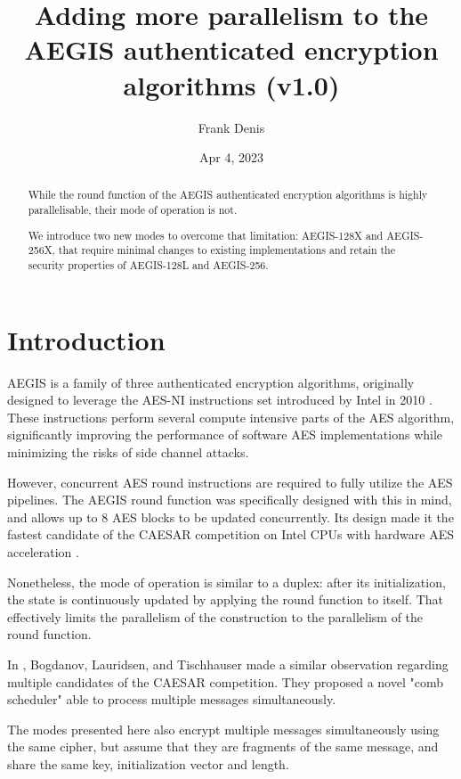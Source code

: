 \documentclass[envcountsame,runningheads,notitlepage]{llncs}
\title{Adding more parallelism to the AEGIS authenticated encryption algorithms (v1.0)}
\date{Apr 4, 2023}
\author{
  Frank Denis\inst{}
}
\institute{Fastly Inc.\\
  \href{mailto:fde@00f.net}{fde@00f.net}
}
\author{}
\institute{}
\begin{document}
\maketitle

\markboth{}{}

\begin{abstract}
  While the round function of the AEGIS authenticated encryption algorithms is highly parallelisable, their mode of operation is not.

  We introduce two new modes to overcome that limitation: AEGIS-128X and AEGIS-256X, that require minimal changes to existing implementations and retain the security properties of AEGIS-128L and AEGIS-256.
\end{abstract}

\section{Introduction}
\label{sec:introduction}

AEGIS \cite{SAC:WuPre13} is a family of three authenticated encryption algorithms, originally designed to leverage the AES-NI instructions set introduced by Intel in 2010 \cite{Akdemir2010BreakthroughAP}.
These instructions perform several compute intensive parts of the AES algorithm, significantly improving the performance of software AES implementations while minimizing the risks of side channel attacks.

However, concurrent AES round instructions are required to fully utilize the AES pipelines. The AEGIS round function was specifically designed with this in mind, and allows up to 8 AES blocks to be updated concurrently. Its design made it the fastest candidate of the CAESAR competition on Intel CPUs with hardware AES acceleration \cite{EPRINT:ARAR16}.

Nonetheless, the mode of operation is similar to a duplex: after its initialization, the state is continuously updated by applying the round function to itself.
That effectively limits the parallelism of the construction to the parallelism of the round function.

In \cite{FSE:BogLauTis15}, Bogdanov, Lauridsen, and Tischhauser made a similar observation regarding multiple candidates of the CAESAR competition. They proposed a novel "comb scheduler" able to process multiple messages simultaneously.

The modes presented here also encrypt multiple messages simultaneously using the same cipher, but assume that they are fragments of the same message, and share the same key, initialization vector and length.
\end{document}
